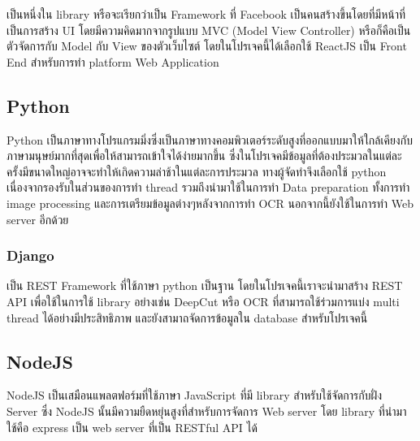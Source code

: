 เป็นหนึ่งใน library หรือจะเรียกว่าเป็น Framework ที่ Facebook  เป็นคนสร้างขึ้นโดยที่มีหน้าที่เป็นการสร้าง UI โดยมีความคิดมากจากรูปแบบ MVC \cite{techterms} (Model View Controller) หรือก็คือเป็นตัวจัดการกับ Model กับ View ของตัวเว็บไซต์ โดยในโปรเจคนี้ได้เลือกใช้ ReactJS เป็น Front End สำหรับการทำ platform Web Application 

\subsection{Python}

Python เป็นภาษาทางโปรแกรมมิ่งซึ่งเป็นภาษาทางคอมพิวเตอร์ระดับสูงที่ออกแบบมาให้ใกล้เคียงกับภาษามนุษย์มากที่สุดเพื่อให้สามารถเข้าใจได้ง่ายมากขึ้น ซึ่งในโปรเจคมีข้อมูลที่ต้องประมวลในแต่ละครั้งมีขนาดใหญ่อาจจะทำให้เกิดความล่าช้าในแต่ละการประมวล ทางผู้จัดทำจึงเลือกใช้ python เนื่องจากรองรับในส่วนของการทำ thread รวมถึงนำมาใช้ในการทำ Data preparation ทั้งการทำ image processing และการเตรียมข้อมูลต่างๆหลังจากการทำ OCR นอกจากนี้ยังใช้ในการทำ Web server อีกด้วย 

\subsubsection{Django}

เป็น REST Framework ที่ใช้ภาษา python เป็นฐาน โดยในโปรเจคนี้เราจะนำมาสร้าง REST API  เพื่อใช้ในการใช้ library อย่างเช่น DeepCut หรือ OCR ที่สามารถใช้ร่วมการแบ่ง multi thread ได้อย่างมีประสิทธิภาพ และยังสามาถจัดการข้อมูลใน database สำหรับโปรเจคนี้

\subsection{NodeJS}

NodeJS เป็นเสมือนแพลตฟอร์มที่ใช้ภาษา JavaScript ที่มี library สำหรับใช้จัดการกับฝั่ง Server ซึ่ง NodeJS นั้นมีความยืดหยุ่นสูงที่สำหรับการจัดการ Web server โดย library ที่นำมาใช้คือ express เป็น web server ที่เป็น RESTful API ได้
